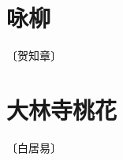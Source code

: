 \documentclass[12pt,UTF-8,openany]{ctexbook}
\begin{document}
\vspace{8pt}


\section{咏柳}

\begin{center}
    \vspace{10pt}
    
    \begin{normalsize}
        
        〔贺知章〕
        
    \end{normalsize}
    
    \vspace{8pt}
    
    \begin{large}
        
        
        
    \end{large}
    
\end{center}

\vspace{8pt}


\section{大林寺桃花}

\begin{center}
    \vspace{10pt}
    
    \begin{normalsize}
        
        〔白居易〕
        
    \end{normalsize}
    
    \vspace{8pt}
    
    \begin{large}
        
        
        
    \end{large}
    
\end{center}
\end{document}
